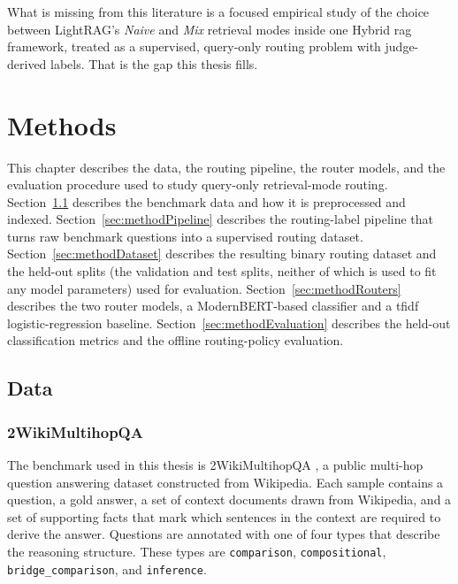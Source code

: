 \documentclass[english, bibtex]{kththesis}               %
\numberwithin{listing}{chapter}
\begin{document}
What is missing from this literature is a focused empirical study of the choice between LightRAG's \emph{Naive} and \emph{Mix} retrieval modes inside one Hybrid \gls{rag} framework, treated as a supervised, query-only routing problem with judge-derived labels. That is the gap this thesis fills.

\cleardoublepage
\chapter{Methods}
\label{ch:methods}

This chapter describes the data, the routing pipeline, the router models, and the evaluation procedure used to study query-only retrieval-mode routing. Section~\ref{sec:methodData} describes the benchmark data and how it is preprocessed and indexed. Section~\ref{sec:methodPipeline} describes the routing-label pipeline that turns raw benchmark questions into a supervised routing dataset. Section~\ref{sec:methodDataset} describes the resulting binary routing dataset and the held-out splits (the validation and test splits, neither of which is used to fit any model parameters) used for evaluation. Section~\ref{sec:methodRouters} describes the two router models, a ModernBERT-based classifier and a \gls{tfidf} logistic-regression baseline. Section~\ref{sec:methodEvaluation} describes the held-out classification metrics and the offline routing-policy evaluation.

\section{Data}
\label{sec:methodData}

\subsection{2WikiMultihopQA}
\label{sec:method2wiki}

The benchmark used in this thesis is 2WikiMultihopQA \cite{ho2020twowiki}, a public multi-hop question answering dataset constructed from Wikipedia. Each sample contains a question, a gold answer, a set of context documents drawn from Wikipedia, and a set of supporting facts that mark which sentences in the context are required to derive the answer. Questions are annotated with one of four types that describe the reasoning structure. These types are \texttt{comparison}, \texttt{compositional}, \texttt{bridge\_comparison}, and \texttt{inference}.
\end{document}
